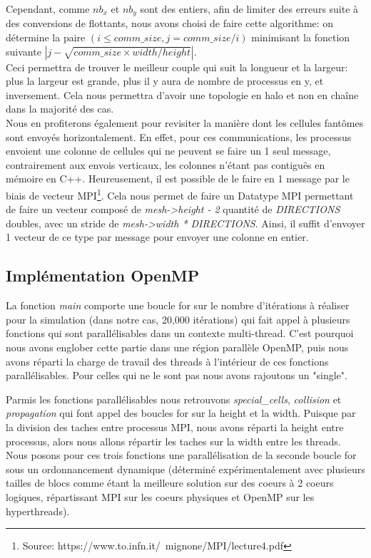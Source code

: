 Cependant, comme $nb_x$ et $nb_y$ sont des entiers, afin de limiter des erreurs suite à des conversions de flottants, nous avons choisi de faire cette algorithme:
on détermine la paire $\left(i\leq comm\_size, j= comm\_size/i\right)$ minimisant la fonction suivante $\left|j - \sqrt{comm\_size \times width / height}\right|$.\\
Ceci permettra de trouver le meilleur couple qui suit la longueur et la largeur: plus la largeur est grande, plus il y aura de nombre de processus en y, et inversement. Cela nous permettra d'avoir une topologie en halo et non en chaîne dans la majorité des cas.\\

Nous en profiterons également pour revisiter la manière dont les cellules fantômes sont envoyés horizontalement. En effet, pour ces communications, les processus envoient une colonne de cellules qui ne peuvent se faire un 1 seul message, contrairement aux envois verticaux, les colonnes n'étant pas contiguës en mémoire en C++. Heureusement, il est possible de le faire en 1 message par le biais de vecteur MPI\footnote{Source: https://www.to.infn.it/~mignone/MPI/lecture4.pdf}. Cela nous permet de faire un Datatype MPI permettant de faire un vecteur composé de \textit{mesh->height - 2} quantité de \textit{DIRECTIONS} doubles, avec un stride de \textit{mesh->width * DIRECTIONS}. Ainsi, il suffit d'envoyer 1 vecteur de ce type par message pour envoyer une colonne en entier.

\subsection{Implémentation OpenMP}

La fonction \textit{main} comporte une boucle for sur le nombre d'itérations à réaliser pour la simulation (dans notre cas, 20,000 itérations) qui fait appel à plusieurs fonctions qui sont parallélisables dans un contexte multi-thread. C'est pourquoi nous avons englober cette partie dans une région parallèle OpenMP, puis nous avons réparti la charge de travail des threads à l'intérieur de ces fonctions parallélisables. Pour celles qui ne le sont pas nous avons rajoutons un "single".

Parmis les fonctions parallélisables nous retrouvons \textit{special\_cells}, \textit{collision} et \textit{propagation} qui font appel des boucles for sur la height et la width. Puisque par la division des taches entre processus MPI, nous avons réparti la height entre processus, alors nous allons répartir les taches sur la width entre les threads. Nous posons pour ces trois fonctions une parallélisation de la seconde boucle for sous un ordonnancement dynamique (déterminé expérimentalement avec plusieurs tailles de blocs comme étant la meilleure solution sur des coeurs à 2 coeurs logiques, répartissant MPI sur les coeurs physiques et OpenMP sur les hyperthreads).

